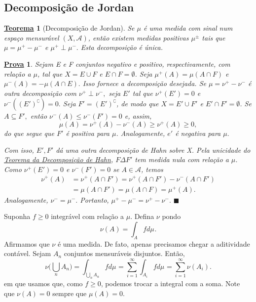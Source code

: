 \documentclass{article}
\newtheorem*{theorem*}{\underline{Teorema}}
\newtheorem*{proof*}{\underline{Prova}}
\renewcommand\qedsymbol{$\blacksquare$}
\begin{document}
\subsection{Decomposição de Jordan}
 \hypertarget{jordan_decomposition}{
   \begin{theorem*}[Decomposição de Jordan]
  Se \(\mu \) é uma medida com sinal num espaço mensurável \((X, \mathcal{A})\), então existem medidas positivas \(\mu ^{\pm}\) tais que \(\mu = \mu ^{+} - \mu ^{-}\) e \(\mu ^{+}\perp \mu ^{-}.\) Esta decomposição é única.
\end{theorem*}}
\begin{proof*}
  Sejam E e F conjuntos negativo e positivo, respectivamente, com relação a \(\mu \), tal que \(X = E\cup F\) e \(E\cap F = \emptyset \). Seja \(\mu ^{+}(A) = \mu (A\cap F)\) e \(\mu ^{-}(A)=-\mu (A\cap E).\) Isso 
  fornece a decomposição desejada. Se \(\mu = \nu^{+}-\nu^{-}\) é outra decomposição com \(\nu^{+}\perp \nu^{-},\) seja \(E'\) tal que \(\nu^{+}(E') = 0\) e 
  \(\nu^{-}((E')^{\complement}) = 0.\) Seja \(F'=(E')^{\complement}\), de modo que \(X = E' \cup F'\) e \(E'\cap F' = \emptyset \). Se \(A\subseteq F',\) então \(\nu^{-}(A)\leq \nu^{-}(F') = 0\) e, assim,
    \[
      \mu (A) = \nu ^{+}(A) - \nu ^{-}(A) \geq \nu ^{+}(A) \geq 0,
    \]
  do que segue que \(F'\) é positiva para \(\mu \). Analogamente, \(e'\) é negativa para \(\mu .\) 

  Com isso, \(E', F'\) dá uma outra decomposição de Hahn sobre X. Pela unicidade do \hyperlink{hahn}{Teorema da Decomposição de Hahn}, \(F\Delta F'\) tem medida nula com relação a \(\mu \). Como \(\nu ^{+}(E') = 0\) e \(\nu^{-}(F') = 0\)
se \(A\in \mathcal{A}\), temos 
 \begin{align*}
   \nu ^{+}(A) &= \nu ^{+}(A\cap F') = \nu ^{+}(A\cap F') - \nu ^{-}(A\cap F')\\ 
               &= \mu (A\cap F') = \mu (A\cap F) = \mu ^{+}(A).
 \end{align*}
 Analogamente, \(\nu^{-}=\mu ^{-}.\) Portanto, \(\mu^{+}-\mu ^{-}= \nu^{+}-\nu ^{-}. \) \qedsymbol
\end{proof*}
   Suponha \(f\geq 0\) integrável com relação a \(\mu \). Defina \(\nu \) pondo 
     \[
       \nu (A) = \int_{A}f d\mu_{}.
     \]
    Afirmamos que \(\nu \) é uma medida. De fato, apenas precisamos chegar a aditividade contável. Sejam \(A_{n}\) conjuntos mensuráveis disjuntos. Então,
      \[
        \nu \biggl(\bigcup_{n}^{}A_{n}\biggr) = \int_{\bigcup_{n}^{}A_{n}}f d\mu_{} = \sum\limits_{i=1}^{\infty}\int_{A_{i}}f d\mu_{} = \sum\limits_{i=1}^{\infty}\nu (A_{i}).
      \]
    em que usamos que, como \(f\geq 0\), podemos trocar a integral com a soma. Note que \(\nu (A) = 0\) sempre que \(\mu (A) = 0\). 
\end{document}
